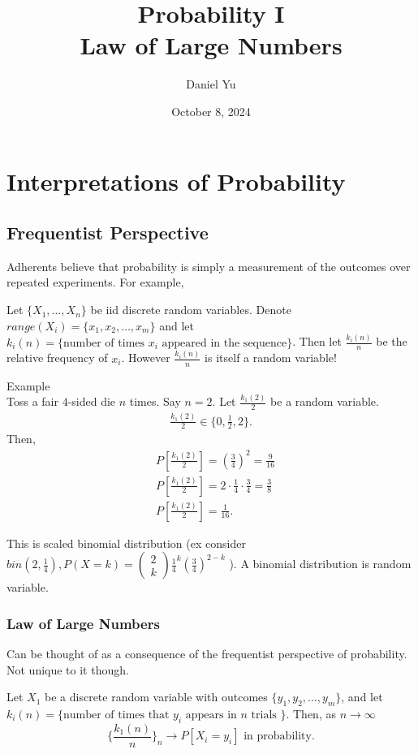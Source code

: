 \documentclass[a4paper]{article}
\title{\Huge{Probability I}\\Law of Large Numbers}
\author{\huge{Daniel Yu}}
\date{October 8, 2024}
\begin{document}
\maketitle
\newpage%
\tableofcontents
\pagebreak
\section{Interpretations of Probability}
\subsection{Frequentist Perspective}
Adherents believe that probability is simply a measurement of the outcomes over repeated experiments. For example,

\begin{note}
  Let $\{X_1, \ldots, X_n\} $ be iid discrete random variables. Denote $range(X_i) = \{x_1,x_2,\ldots,x_m\} $ and let $k_i(n)= \{\text{number of times $x_i$ appeared in the sequence}\}$. Then let $\frac{k_i(n)}{n}$ be the relative frequency of $x_i$. However  $\frac{k_i(n)}{n}$ is itself a random variable!
\end{note}

\begin{remark}{Example}\\
  Toss a fair $4$-sided die  $n$ times. Say $n=2$.  Let  $\frac{k_1(2)}{2}$ be a random variable. 
  \begin{align*}
    \frac{k_1(2)}{2} \in \{0,\frac{1}{2},2\} 
  .\end{align*}
  Then,
  \begin{align*}
    & P[\frac{k_1(2)}{2}] = (\frac{3}{4})^{2} = \frac{9}{16} \\
    & P[\frac{k_1(2)}{2}] = 2 \cdot \frac{1}{4} \cdot \frac{3}{4} = \frac{3}{8} \\
    & P[\frac{k_1(2)}{2}] = \frac{1}{16}
  .\end{align*}

  This is scaled binomial distribution (ex consider $bin(2,\frac{1}{4}), P(X=k)=\begin{pmatrix} 2\\ k \end{pmatrix}\frac{1}{4}^{k}(\frac{3}{4})^{2-k}$ ). A binomial distribution is random variable. 
\end{remark}

\subsubsection{Law of Large Numbers}
Can be thought of as a consequence of the frequentist perspective of probability. Not unique to it though.
\begin{theorem}
  Let $X_1$ be a discrete random variable with outcomes  $\{y_1, y_2, \ldots, y_m\} $, and let $k_i(n) = \{\text{number of times that $y_i$ appears in $n$ trials }\} $. Then, as $n \to \infty$
  \[
    \{\frac{k_1(n)}{n}\}_{n}  \to P[X_i = y_i] \text{  in probability} 
  .\] 
\end{theorem}
\end{document}
